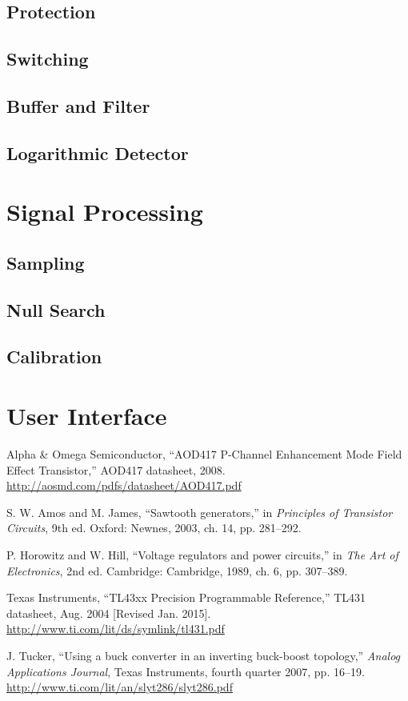 \documentclass[article]{memoir}
\begin{document}
\begin{multicols}{2}
\subsection{Protection}
\subsection{Switching}
\subsection{Buffer and Filter}
\subsection{Logarithmic Detector}

\section{Signal Processing}
\subsection{Sampling}
\subsection{Null Search}
\subsection{Calibration}

\section{User Interface}

\end{multicols}

\newpage
\begin{thebibliography}{9}

Alpha \& Omega Semiconductor, ``AOD417 P-Channel Enhancement Mode Field Effect Transistor,''
AOD417 datasheet, 2008. \url{http://aosmd.com/pdfs/datasheet/AOD417.pdf}

S. W. Amos and M. James, ``Sawtooth generators,'' in
\emph{Principles of Transistor Circuits}, 9th ed. Oxford: Newnes, 2003, ch. 14, pp. 281--292.

P. Horowitz and W. Hill, ``Voltage regulators and power circuits,'' in
\emph{The Art of Electronics}, 2nd ed. Cambridge: Cambridge, 1989, ch. 6, pp. 307--389.

Texas Instruments, ``TL43xx Precision Programmable Reference,''
TL431 datasheet, Aug. 2004 [Revised Jan. 2015]. \url{http://www.ti.com/lit/ds/symlink/tl431.pdf}

J. Tucker, ``Using a buck converter in an inverting buck-boost topology,''
\emph{Analog Applications Journal}, Texas Instruments, fourth quarter 2007, pp. 16--19.
\url{http://www.ti.com/lit/an/slyt286/slyt286.pdf}
\end{thebibliography}
\end{document}
